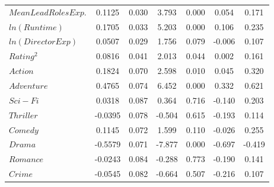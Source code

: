 \begin{table}[H]
\begin{center}
\begin{tabular}{lcccccc}
                    \textbf{$Mean Lead Roles Exp.$} &       0.1125  &        0.030     &     3.793  &         0.000        &        0.054    &        0.171     \\
                    \textbf{$ln(Runtime)$}          &       0.1705  &        0.033     &     5.203  &         0.000        &        0.106    &        0.235     \\
                    \textbf{$ln(Director Exp)$}     &       0.0507  &        0.029     &     1.756  &         0.079        &       -0.006    &        0.107     \\
                    \textbf{$Rating^2$}             &       0.0816  &        0.041     &     2.013  &         0.044        &        0.002    &        0.161     \\
                    \textbf{$Action$}               &       0.1824  &        0.070     &     2.598  &         0.010        &        0.045    &        0.320     \\
                    \textbf{$Adventure$}            &       0.4765  &        0.074     &     6.452  &         0.000        &        0.332    &        0.621     \\
                    \textbf{$Sci-Fi$}               &       0.0318  &        0.087     &     0.364  &         0.716        &       -0.140    &        0.203     \\
                    \textbf{$Thriller$}             &      -0.0395  &        0.078     &    -0.504  &         0.615        &       -0.193    &        0.114     \\
                    \textbf{$Comedy$}               &       0.1145  &        0.072     &     1.599  &         0.110        &       -0.026    &        0.255     \\
                    \textbf{$Drama$}                &      -0.5579  &        0.071     &    -7.877  &         0.000        &       -0.697    &       -0.419     \\
                    \textbf{$Romance$}              &      -0.0243  &        0.084     &    -0.288  &         0.773        &       -0.190    &        0.141     \\
                    \textbf{$Crime$}                &      -0.0545  &        0.082     &    -0.664  &         0.507        &       -0.216    &        0.107     \\
                    \bottomrule
                \end{tabular}
                \begin{tabular}{lclc}

\end{tabular}
\end{center}
\end{table}
